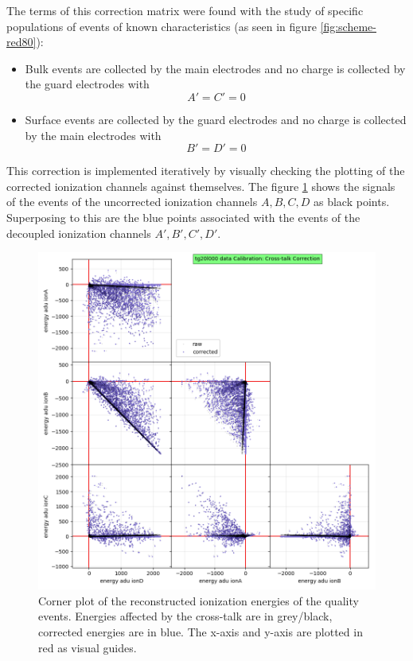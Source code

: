 The terms of this correction matrix were found with the study of specific populations of events of known characteristics (as seen in figure \ref{fig:scheme-red80}):
\begin{itemize}
	\item Bulk events are collected by the main electrodes and no charge is collected by the guard electrodes with $$A'= C' = 0$$
	\item Surface events are collected by the guard electrodes and no charge is collected by the main electrodes with $$B' = D' = 0$$
\end{itemize}

This correction is implemented iteratively by visually checking the plotting of the corrected ionization channels against themselves. The figure \ref{fig:crosstalk-correction} shows the signals of the events of the uncorrected ionization channels $A, B, C, D$ as black points. Superposing to this are the blue points associated with the events of the decoupled ionization channels $A', B', C', D'$.

\begin{figure}
\centering
\includegraphics[width=\linewidth,]{Figures/Neutron/crosstalk_correction.png}
\caption{Corner plot of the reconstructed ionization energies of the quality events. Energies affected by the cross-talk are in grey/black, corrected energies are in blue. The x-axis and y-axis are plotted in red as visual guides.}
\label{fig:crosstalk-correction}
\end{figure}

